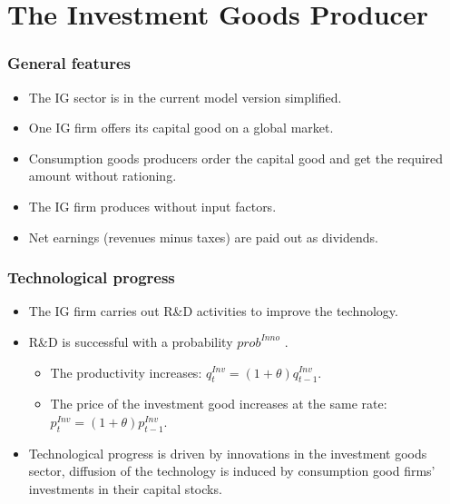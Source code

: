 \documentclass{beamer}
\begin{document}
\section{The Investment Goods Producer}



\frame
{

  \frametitle{General features} 
\begin{itemize}

\item The IG sector is in the current model version simplified.

\item One IG firm offers its capital good on a global market.

\item Consumption goods producers order the capital good and get the required amount without rationing. 

\item The IG firm produces without input factors.

\item Net earnings (revenues minus taxes) are paid out as dividends. 

\end{itemize}
  
}



\frame
{

  \frametitle{Technological progress} 
\begin{itemize}

\item The IG firm carries out R\&D activities to improve the technology.

\item R\&D is successful with a probability $prob^{Inno}$ .
\begin{itemize}
	
	\item The productivity increases: $q_t^{Inv}=(1+\theta)q_{t-1}^{Inv}$.
	
	\item The price of the investment good increases at the same rate: $p_t^{Inv}=(1+\theta)p_{t-1}^{Inv}$.

\end{itemize}

\item Technological progress is driven by innovations in the investment goods sector, diffusion of the technology is induced by consumption good firms' investments in their capital stocks.
  

\end{itemize}
  
}
\end{document}
